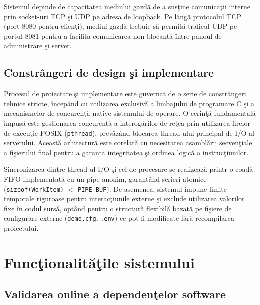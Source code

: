 \documentclass[12pt, a4paper]{article}
\begin{document}
Sistemul depinde de capacitatea mediului gazd\u{a} de a sus\c{t}ine comunica\c{t}ii interne prin socket-uri TCP
\c{s}i UDP pe adresa de loopback. Pe l\^{a}ng\u{a} protocolul TCP (port 8080 pentru clien\c{t}i), mediul gazd\u{a} trebuie
s\u{a} permit\u{a} traficul UDP pe portul 8081 pentru a facilita comunicarea non-blocant\u{a} \^{i}ntre panoul de
administrare \c{s}i server.

\subsection{Constr\^{a}ngeri de design \c{s}i implementare}

Procesul de proiectare \c{s}i implementare este guvernat de o serie de constr\^{a}ngeri tehnice stricte,
\^{i}ncep\^{a}nd cu utilizarea exclusiv\u{a} a limbajului de programare C \c{s}i a mecanismelor de concuren\c{t}\u{a} native
sistemului de operare. O cerin\c{t}\u{a} fundamental\u{a} impus\u{a} este gestionarea concurent\u{a} a interog\u{a}rilor de
re\c{t}ea prin utilizarea firelor de execu\c{t}ie POSIX (\texttt{pthread}), prev\^{a}z\^{a}nd blocarea thread-ului principal
de I/O al serverului. Aceast\u{a} arhitectur\u{a} este corelat\u{a} cu necesitatea asambl\u{a}rii secven\c{t}iale a fi\c{s}ierului
final pentru a garanta integritatea \c{s}i ordinea logic\u{a} a instruc\c{t}iunilor.

Sincronizarea dintre thread-ul I/O \c{s}i cel de procesare se realizeaz\u{a} printr-o coad\u{a} FIFO implementat\u{a}
cu un pipe anonim, garantând scrieri atomice (\texttt{sizeof(WorkItem)} $<$ \texttt{PIPE\_BUF}). De asemenea,
sistemul impune limite temporale riguroase pentru interac\c{t}iunile externe \c{s}i exclude utilizarea valorilor
fixe \^{i}n codul surs\u{a}, opt\^{a}nd pentru o structur\u{a} flexibil\u{a} bazat\u{a} pe fi\c{s}iere de configurare externe
(\texttt{demo.cfg}, \texttt{.env}) ce pot fi modificate f\u{a}r\u{a} recompilarea proiectului.

\section{Func\c{t}ionalit\u{a}\c{t}ile sistemului}

\subsection{Validarea online a dependen\c{t}elor software}
\end{document}
